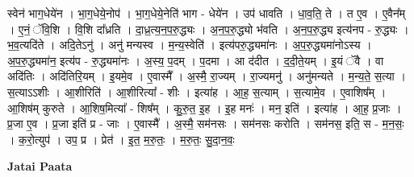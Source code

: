 \documentclass[17pt]{extarticle}
\begin{document}
स्वेन॑ भाग॒धेये॑न । भा॒ग॒धेये॒नोप॑ । भा॒ग॒धेये॒नेति॑ भाग - धेये॑न । उप॑ धावति । धा॒व॒ति॒ ते । त ए॒व । ए॒वैन᳚म् । ए॒नं॒ ॅवि॒शि । वि॒शि दा᳚ध्रति । दा॒ध्र॒त्य॒न॒प॒रु॒द्ध्यः । अ॒न॒प॒रु॒द्ध्यो भ॑वति । अ॒न॒प॒रु॒द्ध्य इत्य॑नप - रु॒द्ध्यः । भ॒व॒त्यदि॑ते । अदि॒तेऽनु॑ । अनु॑ मन्यस्व । म॒न्य॒स्वेति॑ । इत्य॑परु॒द्ध्यमा॑नः । अ॒प॒रु॒द्ध्यमा॑नोऽस्य । अ॒प॒रु॒द्ध्यमा॑न॒ इत्य॑प - रु॒द्ध्यमा॑नः । अ॒स्य॒ प॒दम् । प॒दमा । आ द॑दीत । द॒दी॒ते॒यम् । इ॒यं ॅवै । वा अदि॑तिः । अदि॑तिरि॒यम् । इ॒यमे॒व । ए॒वास्मै᳚ । अ॒स्मै॒ रा॒ज्यम् । रा॒ज्यमनु॑ । अनु॑मन्यते । म॒न्य॒ते॒ स॒त्या । स॒त्याऽऽशीः । आ॒शीरिति॑ । आ॒शीरित्या᳚ - शीः । इत्या॑ह । आ॒ह॒ स॒त्याम् । स॒त्यामे॒व । ए॒वाशिष᳚म् । आ॒शिष॑म् कुरुते । आ॒शिष॒मित्या᳚ - शिष᳚म् । कु॒रु॒त॒ इ॒ह । इ॒ह मनः॑ । मन॒ इति॑ । इत्या॑ह । आ॒ह॒ प्र॒जाः । प्र॒जा ए॒व । प्र॒जा इति॑ प्र - जाः । ए॒वास्मै᳚ । अ॒स्मै॒ सम॑नसः । सम॑नसः करोति । सम॑नस॒ इति॒ स - म॒न॒सः॒ । क॒रो॒त्युप॑ । उप॒ प्र । प्रेत॑ । इ॒त॒ म॒रु॒तः॒ । म॒रु॒तः॒ सु॒दा॒न॒वः॒ \newline

\textbf{Jatai Paata} \newline
\end{document}
